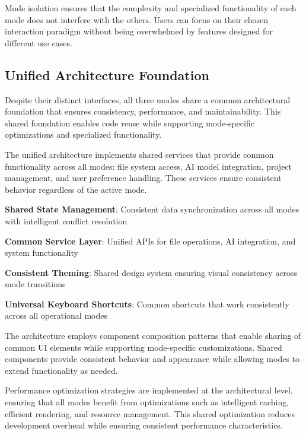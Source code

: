 Mode isolation ensures that the complexity and specialized functionality of each mode does not interfere with the others. Users can focus on their chosen interaction paradigm without being overwhelmed by features designed for different use cases.

\subsection*{Unified Architecture Foundation}

Despite their distinct interfaces, all three modes share a common architectural foundation that ensures consistency, performance, and maintainability. This shared foundation enables code reuse while supporting mode-specific optimizations and specialized functionality.

The unified architecture implements shared services that provide common functionality across all modes: file system access, AI model integration, project management, and user preference handling. These services ensure consistent behavior regardless of the active mode.

\begin{expandedlist}
    \item \textbf{Shared State Management}: Consistent data synchronization across all modes with intelligent conflict resolution
    \item \textbf{Common Service Layer}: Unified APIs for file operations, AI integration, and system functionality
    \item \textbf{Consistent Theming}: Shared design system ensuring visual consistency across mode transitions
    \item \textbf{Universal Keyboard Shortcuts}: Common shortcuts that work consistently across all operational modes
\end{expandedlist}

The architecture employs component composition patterns that enable sharing of common UI elements while supporting mode-specific customizations. Shared components provide consistent behavior and appearance while allowing modes to extend functionality as needed.

Performance optimization strategies are implemented at the architectural level, ensuring that all modes benefit from optimizations such as intelligent caching, efficient rendering, and resource management. This shared optimization reduces development overhead while ensuring consistent performance characteristics.

